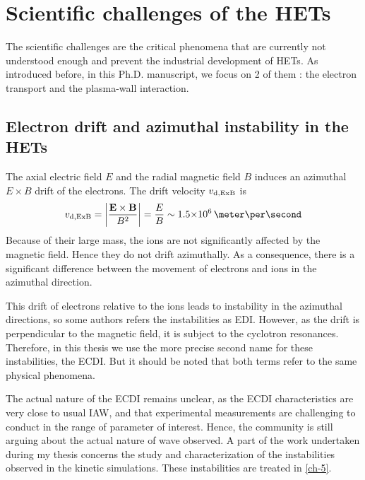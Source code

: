 
\section{Scientific challenges of the HETs}

The scientific challenges are the critical phenomena that are currently not understood enough and prevent the industrial development of \ac{HET}s.
As introduced before, in this Ph.D. manuscript, we focus on 2 of them : the electron transport and the plasma-wall interaction.


\subsection{Electron drift and azimuthal instability in the HETs}

The axial electric field $E$ and the radial magnetic field $B$ induces an azimuthal $E\times B$ drift of the electrons.
The drift velocity $v_{\rm d, ExB}$ is 
\begin{equation} \label{eq-exbdriftbis}
  v_{\rm d, ExB} = \bigg\lvert \frac{\vect{E} \times \vect{B}}{B^2} \bigg\rvert = \frac{E}{B} \sim \sn{1.5}{6} \,\meter\per\second
\end{equation}
Because of their large mass, the ions are not significantly affected by the magnetic field.
Hence they do not drift azimuthally.
As a consequence, there is a significant difference between the movement of electrons and ions in the azimuthal direction.

This drift of electrons relative to the ions leads to instability in the azimuthal directions, so some  authors refers the instabilities as \ac{EDI}.
However, as the drift is perpendicular to the magnetic field, it is subject to the cyclotron resonances.
Therefore, in this thesis we use the more precise second name for these instabilities, the \ac{ECDI}.
But it should be noted that both terms refer to the same physical phenomena.

The actual nature of the \ac{ECDI} remains unclear\citep{boeuf2018}, as the \ac{ECDI} characteristics are very close to usual \ac{IAW}, and that experimental measurements are challenging to conduct in the range of parameter of interest.
Hence, the community is still arguing about the actual nature of wave observed.
A part of the work undertaken during my thesis concerns the study and characterization of the instabilities observed in the kinetic simulations.
These instabilities are treated in \cref{ch-5}.



